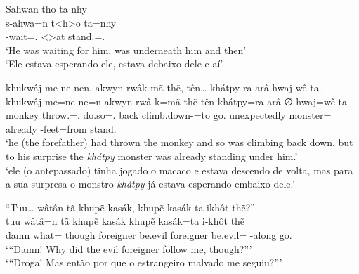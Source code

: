 \documentclass[output=paper,
modfonts,nonflat
]{langsci/langscibook}
\begin{document}
\ea  Sahwan tho ta nhy \\[.3em]
\gll s-ahwa=n               t<h>o                     ta=nhy                 \\
     \Third-wait=\AAnd.\Ss{} <\Third>at stand.\Sg{}=\AAnd.\Ds{} \\
\glt `He was waiting for him, was underneath him and then' \\
     `Ele estava esperando ele, estava debaixo dele e aí' \\
\z

\ea  khukwâj me ne nen, akwyn rwâk mã thẽ, tên\ldots{} khátpy ra arâ hwaj wê ta. \\[.3em]
\gll khukwâj me=ne                  ne=n             akwyn rwâ-k=mã              thẽ      tên          khátpy=ra      arâ     ∅-hwaj=wê        ta          \\
     monkey  throw.\Sg{}=\AAnd.\Ss{} do.so=\AAnd.\Ss{} back  climb.down-\Nmlz{}=to go.\Sg{} unexpectedly monster=\Nom{} already \Third-feet=from stand.\Sg{} \\
\glt `he (the forefather) had thrown the monkey and so was climbing back down, but to his surprise the \textit{khátpy} monster was already standing under him.' \\
     `ele (o antepassado) tinha jogado o macaco e estava descendo de volta, mas para a sua surpresa o monstro \textit{khátpy} já estava esperando embaixo dele.' \\
\label{exe:nommain}
\z

\ea  ``Tuu\ldots{} wâtân tã khupẽ kasák, khupẽ kasák ta ikhôt thẽ?'' \\[.3em]
\gll tuu  wâtâ=n        tã     khupẽ     kasák   khupẽ     kasák=ta       i-khôt       thẽ      \\
     damn what=\N\Fut{} though foreigner be.evil foreigner be.evil=\Nom{} \First-along go.\Sg{} \\
\glt `{}``Damn! Why did the evil foreigner follow me, though?''{}' \\
     `{}``Droga! Mas então por que o estrangeiro malvado me seguiu?''{}' \\
\z
\end{document}
